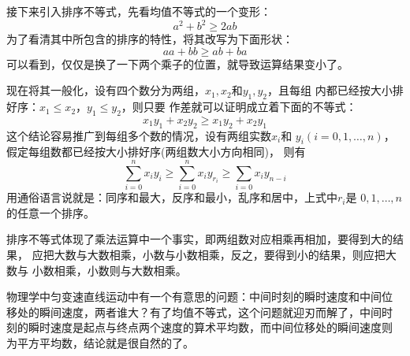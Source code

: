 接下来引入排序不等式，先看均值不等式的一个变形：
\begin{equation}
  a^2+b^2 \geqslant 2ab
\end{equation}
为了看清其中所包含的排序的特性，将其改写为下面形状：
\begin{equation}
  aa+bb \geqslant ab+ba
\end{equation}
可以看到，仅仅是换了一下两个乘子的位置，就导致运算结果变小了。

现在将其一般化，设有四个数分为两组，$x_1, x_2$和$y_1,y_2$，且每组
内都已经按大小排好序：$x_1 \leqslant x_2$，$y_1 \leqslant y_2$，则只要
作差就可以证明成立着下面的不等式：
\begin{equation}
  x_1y_1+x_2y_2 \geqslant x_1y_2+x_2y_1
\end{equation}
这个结论容易推广到每组多个数的情况，设有两组实数$x_i$和
$y_i(i=0,1,\ldots,n)$，假定每组数都已经按大小排好序(两组数大小方向相同)，
则有
\begin{equation}
  \label{eq:sort-equality}
  \sum_{i=0}^nx_iy_i \geqslant \sum_{i=0}^nx_iy_{r_i} \geqslant \sum_{i=0}x_iy_{n-i}
\end{equation}
用通俗语言说就是：同序和最大，反序和最小，乱序和居中，上式中${r_i}$是
$0,1,\ldots,n$的任意一个排序。

排序不等式体现了乘法运算中一个事实，即两组数对应相乘再相加，要得到大的结果，
应把大数与大数相乘，小数与小数相乘，反之，要得到小的结果，则应把大数与
小数相乘，小数则与大数相乘。

物理学中匀变速直线运动中有一个有意思的问题：中间时刻的瞬时速度和中间位
移处的瞬间速度，两者谁大？有了均值不等式，这个问题就迎刃而解了，中间时
刻的瞬时速度是起点与终点两个速度的算术平均数，而中间位移处的瞬间速度则
为平方平均数，结论就是很自然的了。